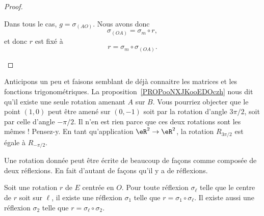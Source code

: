 \begin{proof}
\begin{subproof}
		Dans tous le cas, \( g=\sigma_{(AO)}\). Nous avons donc
		\begin{equation}
			\sigma_{(OA)}=\sigma_m\circ r,
		\end{equation}
		et donc \( r\) est fixé à
		\begin{equation}
			r=\sigma_m\circ\sigma_{(OA)}.
		\end{equation}
	\end{subproof}
\end{proof}

\begin{normaltext}
	Anticipons un peu et faisons semblant de déjà connaitre les matrices et les fonctions trigonométriques. La proposition~\ref{PROPooNXJKooEDOczh} nous dit qu'il existe une seule rotation amenant \( A\) sur \( B\). Vous pourriez objecter que le point \( (1,0)\) peut être amené sur \( (0,-1)\) soit par la rotation d'angle \( 3\pi/2\), soit par celle d'angle \( -\pi/2\). Il n'en est rien parce que ces deux rotations sont les mêmes ! Pensez-y. En tant qu'application \( \eR^2\to \eR^2\), la rotation \( R_{3\pi/2}\) est égale à \( R_{-\pi/2}\).
\end{normaltext}

Une rotation donnée peut être écrite de beaucoup de façons comme composée de deux réflexions. En fait d'autant de façons qu'il y a de réflexions.
\begin{proposition}      \label{PROPooKAZEooLTHWKe}
	Soit une rotation \( r\) de \( E\) centrée en \( O\). Pour toute réflexion \( \sigma_{\ell}\) telle que le centre de \( r\) soit sur \( \ell\), il existe une réflexion \( \sigma_1\) telle que \( r=\sigma_1\circ\sigma_{\ell}\). Il existe aussi une réflexion \( \sigma_2\) telle que \( r=\sigma_{\ell}\circ \sigma_2\).
\end{proposition}

